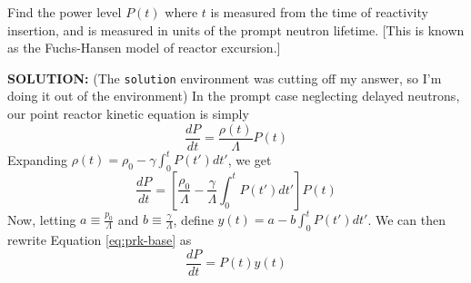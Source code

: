 \documentclass[11pt,addpoints,answers]{exam}
\begin{document}
\begin{questions}
        Find the power level $P(t)$  where $t$ is measured from the time of 
        reactivity insertion, and is measured in units of the prompt neutron lifetime.
        [This is known as the Fuchs-Hansen model of reactor excursion.]

        {\bf SOLUTION:} (The \verb.solution. environment was cutting off my
        answer, so I'm doing it out of the environment)
                    In the prompt case neglecting delayed neutrons, our point
                    reactor kinetic equation is simply
                    \[
                        \frac{dP}{dt} = \frac{\rho(t)}{\Lambda} P(t)
                    \]
                    Expanding $\rho(t) = \rho_0 - \gamma \int_{0}^{t} P(t')dt'$,
                    we get
                    \begin{equation}
                        \label{eq:prk-base}
                        \frac{dP}{dt} = \left[\frac{\rho_0}{\Lambda} -
                        \frac{\gamma}{\Lambda}\int_{0}^{t}P(t') dt'\right] P(t)
                    \end{equation}
                    Now, letting $a \equiv \frac{p_0}{\Lambda}$ and $b \equiv
                    \frac{\gamma}{\Lambda}$, define $y(t) = a -
                    b\int_{0}^{t}P(t') dt'$. We can then rewrite Equation
                    \ref{eq:prk-base} as
                    \begin{equation}
                        \label{eq:prk-y}
                        \frac{dP}{dt} = P(t)y(t)
                    \end{equation}


\end{questions}
\end{document}

